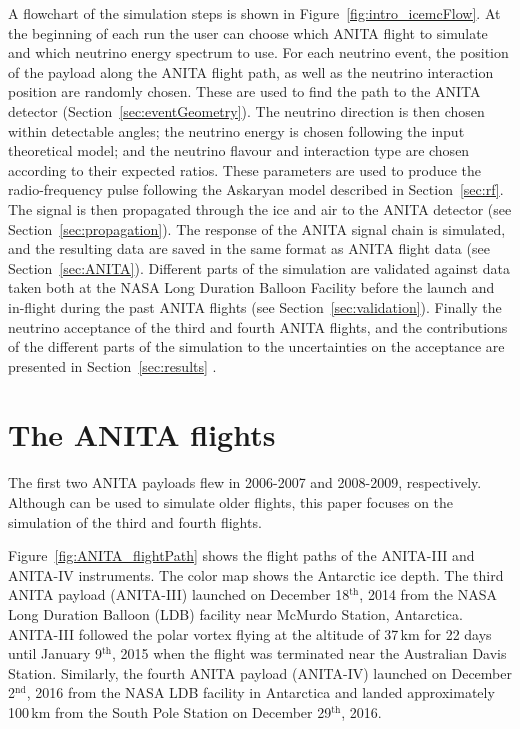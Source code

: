 A flowchart of the \icemc simulation steps is shown in Figure~\ref{fig:intro_icemcFlow}.
At the beginning of each run the user can choose which ANITA flight to simulate and which neutrino energy spectrum to use.
For each neutrino event, the position of the payload along the ANITA flight path, as well as the neutrino interaction position are randomly chosen.
These are used to find the path to the ANITA detector (Section~\ref{sec:eventGeometry}). 
The neutrino direction is then chosen within detectable angles; the neutrino energy is chosen following the input theoretical model; and the neutrino flavour and interaction type are chosen according to their expected ratios. 
These parameters are used to produce the radio-frequency pulse following the Askaryan model described in Section~\ref{sec:rf}.
The signal is then propagated through the ice and air to the ANITA
detector (see Section~\ref{sec:propagation}). 
The response of the ANITA signal chain is simulated, and the resulting 
data are saved in the same format as ANITA flight data 
(see Section~\ref{sec:ANITA}).
Different parts of the simulation are validated against data taken
both at the NASA Long Duration Balloon Facility
before the launch and in-flight during the past ANITA flights (see
Section~\ref{sec:validation}).
Finally the neutrino acceptance of the third and fourth ANITA flights, and
the contributions of the different parts of the simulation to the uncertainties on the acceptance are presented in Section~\ref{sec:results} .


\section{The ANITA flights}
\label{sec:anita3}
The first two ANITA payloads flew in 2006-2007\cite{ANITA1paper} and 2008-2009\cite{ANITA2paper,ANITA2erratum}, respectively.
Although \icemc can be used to simulate older flights, this paper focuses on the simulation of the third and fourth flights.

Figure~\ref{fig:ANITA_flightPath} shows the flight paths of the ANITA-III and ANITA-IV instruments. 
The color map shows the Antarctic ice depth. 
The third ANITA payload (ANITA-III) launched on December 18$^{\text{th}}$, 2014 from the
NASA Long Duration Balloon (LDB) facility near McMurdo Station, Antarctica.
ANITA-III followed the polar vortex flying at the altitude of 37\,km for
22 days until January 9$^{\text{th}}$, 2015 when the flight was terminated
near the Australian Davis Station.
Similarly, the fourth ANITA payload (ANITA-IV) launched on December 2$^{\text{nd}}$, 2016 from the NASA LDB facility in Antarctica and landed approximately 100\,km from the South Pole Station on December 29$^{\text{th}}$, 2016.


